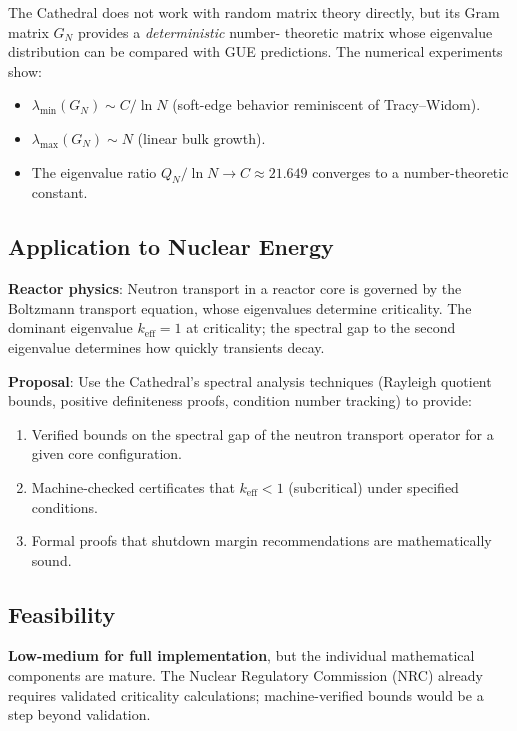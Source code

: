 \documentclass[11pt,a4paper]{article}
\begin{document}
The Cathedral does not work with random matrix theory directly,
but its Gram matrix $G_N$ provides a \emph{deterministic} number-
theoretic matrix whose eigenvalue distribution can be compared with
GUE predictions. The numerical experiments show:

\begin{itemize}
  \item $\lambda_{\min}(G_N) \sim C / \ln N$ (soft-edge behavior
    reminiscent of Tracy--Widom).
  \item $\lambda_{\max}(G_N) \sim N$ (linear bulk growth).
  \item The eigenvalue ratio $Q_N / \ln N \to C \approx 21.649$
    converges to a number-theoretic constant.
\end{itemize}

\subsection{Application to Nuclear Energy}

\textbf{Reactor physics}: Neutron transport in a reactor core is
governed by the Boltzmann transport equation, whose eigenvalues
determine criticality. The dominant eigenvalue $k_{\text{eff}} = 1$
at criticality; the spectral gap to the second eigenvalue determines
how quickly transients decay.

\textbf{Proposal}: Use the Cathedral's spectral analysis techniques
(Rayleigh quotient bounds, positive definiteness proofs, condition
number tracking) to provide:

\begin{enumerate}
  \item Verified bounds on the spectral gap of the neutron transport
    operator for a given core configuration.
  \item Machine-checked certificates that $k_{\text{eff}} < 1$
    (subcritical) under specified conditions.
  \item Formal proofs that shutdown margin recommendations are
    mathematically sound.
\end{enumerate}

\subsection{Feasibility}

\textbf{Low-medium for full implementation}, but the individual
mathematical components are mature. The Nuclear Regulatory
Commission (NRC) already requires validated criticality calculations;
machine-verified bounds would be a step beyond validation.
\end{document}
